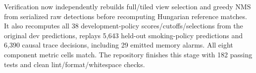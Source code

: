 Verification now independently rebuilds full/tiled view selection and greedy NMS from serialized raw detections before recomputing Hungarian reference matches. It also recomputes all 38 development-policy scores/cutoffs/selections from the original dev predictions, replays 5,643 held-out smoking-policy predictions and 6,390 causal trace decisions, including 29 emitted memory alarms. All eight component metric cells match. The repository finishes this stage with 182 passing tests and clean lint/format/whitespace checks.
